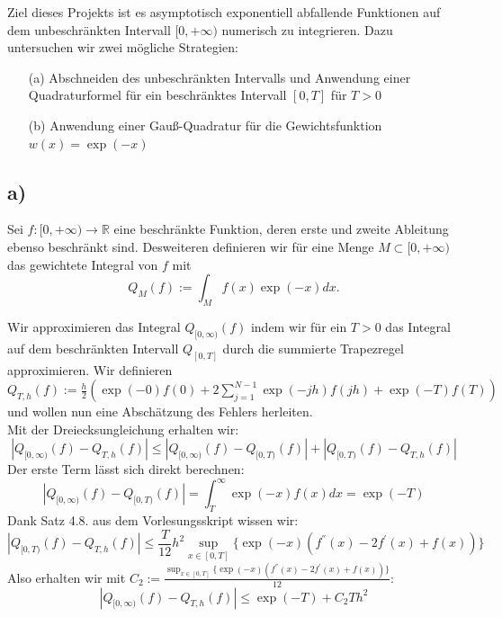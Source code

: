 

Ziel dieses Projekts ist es asymptotisch exponentiell abfallende Funktionen auf dem unbeschränkten Intervall $[0, +\infty)$ numerisch zu integrieren. Dazu untersuchen wir zwei mögliche Strategien:

\begin{itemize}
    \item[(a)] Abschneiden des unbeschränkten Intervalls und Anwendung einer Quadraturformel für ein beschränktes Intervall $[0, T]$ für $T > 0$

    \item[(b)] Anwendung einer Gauß-Quadratur für die Gewichtsfunktion $w(x) = \exp(-x)$
\end{itemize}


\label{listing:1}


\subsection*{a)}
Sei $f: [0,+\infty) \rightarrow \mathbb{R}$ eine beschränkte Funktion, deren erste und zweite Ableitung ebenso beschränkt sind. Desweiteren definieren wir für eine Menge $M \subset [0,+\infty)$ das gewichtete Integral von $f$ mit
\[Q_M(f) := \int_M f(x)\exp(-x) dx.\]

Wir approximieren das Integral $Q_{[0,\infty)}(f)$ indem wir für ein $T > 0$ das Integral auf dem beschränkten Intervall $Q_{[0,T]}$ durch die summierte Trapezregel approximieren. 
Wir definieren $Q_{T,h}(f) := \frac{h}{2}\left(\exp(-0)f(0) + 2\sum_{j=1}^{N-1}\exp(-jh)f(jh)+\exp(-T)f(T)\right)$ und wollen nun eine Abschätzung des Fehlers herleiten.\\
Mit der Dreiecksungleichung erhalten wir:
\begin{equation*}
    |Q_{[0,\infty)}(f) - Q_{T,h}(f)| \leq |Q_{[0,\infty)}(f) - Q_{[0,T)}(f)| + |Q_{[0,T)}(f) - Q_{T,h}(f)|
\end{equation*}
Der erste Term lässt sich direkt berechnen:
\begin{equation*}
    |Q_{[0,\infty)}(f) - Q_{[0,T)}(f)| = \int_{T}^{\infty}\exp(-x)f(x)dx = \exp(-T)
\end{equation*}
Dank Satz 4.8. aus dem Vorlesungsskript wissen wir:
\begin{equation*}
    |Q_{[0,T)}(f) - Q_{T,h}(f)| \leq \frac{T}{12}h^2 \sup_{x\in[0,T]}\{\exp(-x)( f^{''}(x)-2f^{'}(x)+f(x))\}
\end{equation*}
Also erhalten wir mit $C_2 := \frac{\sup_{x\in[0,T]}\{\exp(-x)( f^{''}(x)-2f^{'}(x)+f(x))\}}{12}$:
\begin{equation*}
    |Q_{[0,\infty)}(f) - Q_{T,h}(f)| \leq \exp(-T) + C_2Th^2
\end{equation*}

